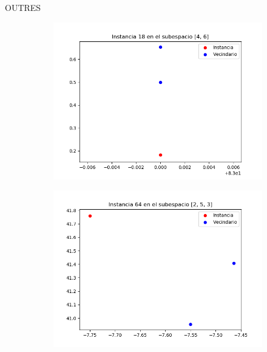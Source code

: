 \documentclass[10pt]{beamer}
\begin{document}
\begin{frame}[fragile]{OUTRES}
\vspace{10px}

\begin{figure}
	\centering
	\begin{subfigure}{0.49\textwidth}
		\centering
		\includegraphics[scale=0.36]{Imagenes/22}
	\end{subfigure}
	\pause
	\begin{subfigure}{0.49\textwidth}
		\centering
		\includegraphics[scale=0.36]{Imagenes/68-tsne}
	\end{subfigure}
\end{figure}

\end{frame}
\end{document}
